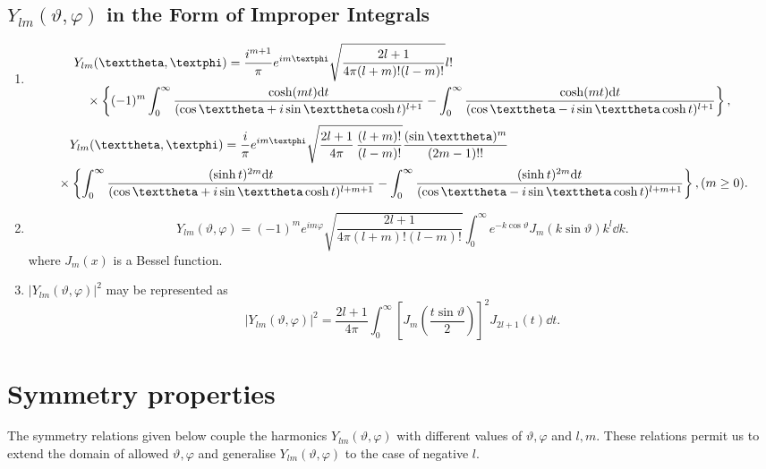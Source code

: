 \subsection{$Y_{l m}(\vartheta, \varphi)$ in the Form of Improper Integrals}\label{sec:5.3.3}
\begin{enumerate}[label=(\alph*)]
\item
\begin{align}
& Y_{l m}(\vartheta, \varphi)=\frac{i^{m+1}}{\pi} e^{i m \varphi} \sqrt{\frac{2 l+1}{4 \pi(l+m)!(l-m)!}} l!  \notag\\
& \quad \times\left\{(-1)^{m} \int_{0}^{\infty} \frac{\cosh (m t) \dd t}{(\cos \vartheta+i \sin \vartheta \cosh t)^{l+1}}-\int_{0}^{\infty} \frac{\cosh (m t) \dd t}{(\cos \vartheta-i \sin \vartheta \cosh t)^{l+1}}\right\}  ,\label{eq:5:3:12}
\end{align}
\begin{align}
& \quad Y_{l m}(\vartheta, \varphi)=\frac{i}{\pi} e^{i m \varphi} \sqrt{\frac{2 l+1}{4 \pi} \, \frac{(l+m)!}{(l-m)!}} \frac{(\sin \vartheta)^{m}}{(2 m-1)!!}  \notag\\
& \times\left\{\int_{0}^{\infty} \frac{(\sinh t)^{2 m} \dd t}{(\cos \vartheta+i \sin \vartheta \cosh t)^{l+m+1}}-\int_{0}^{\infty} \frac{(\sinh t)^{2 m} \dd t}{(\cos \vartheta-i \sin \vartheta \cosh t)^{l+m+1}}\right\},(m \geq 0) .\label{eq:5:3:13}
\end{align}
\item
\begin{equation}
Y_{l m}(\vartheta, \varphi)=(-1)^{m} e^{i m \varphi} \sqrt{\frac{2 l+1}{4 \pi(l+m)!(l-m)!}} \int_{0}^{\infty} e^{-k \cos \vartheta} J_{m}(k \sin \vartheta) k^{l} \dd k. \label{eq:5:3:14}
\end{equation}
where $J_{m}(x)$ is a Bessel function.\\
\item $\left|Y_{l m}(\vartheta, \varphi)\right|^{2}$ may be represented as
\begin{equation}
\left|Y_{l m}(\vartheta, \varphi)\right|^{2}=\frac{2 l+1}{4 \pi} \int_{0}^{\infty}\left[J_{m}\left(\frac{t \sin \vartheta}{2}\right)\right]^{2} J_{2 l+1}(t) \dd t .\label{eq:5:3:15}
\end{equation}
\end{enumerate}
\section{Symmetry properties}\label{sec:5.4}
The symmetry relations given below couple the harmonics $Y_{l m}(\vartheta, \varphi)$ with different values of $\vartheta, \varphi$ and $l, m$. These relations permit us to extend the domain of allowed $\vartheta, \varphi$ and generalise $Y_{l m}(\vartheta, \varphi)$ to the case of negative $l$.\\
